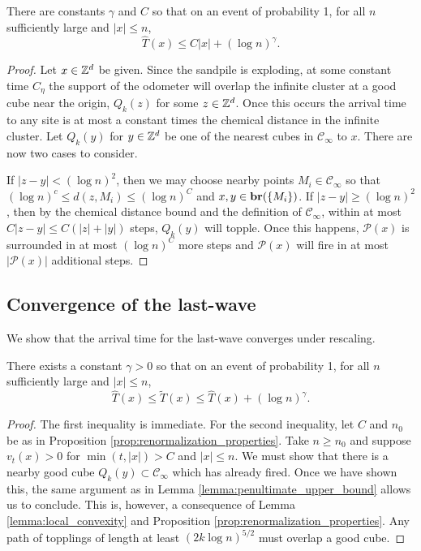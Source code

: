 \documentclass[12pt]{amsart}
\begin{document}
\begin{lemma} \label{lemma:penultimate_upper_bound}
	There are constants $\gamma$ and $C$ so that on an event of probability 1, for all $n$ sufficiently large and $|x| \leq n$, 
	\[
	\hat{T}(x) \leq  C |x| +  (\log n)^{\gamma} .
	\]
\end{lemma}
\begin{proof}
	Let $x \in \mathbb{Z}^d$ be given. Since the sandpile is exploding, at some constant time $C_\eta$
	the support of the odometer will overlap the infinite cluster at a good cube near the origin, $Q_k(z)$ for some $z \in \mathbb{Z}^d$. Once this occurs the arrival time to any site is at most a constant times the chemical distance in the infinite cluster. Let $Q_k(y)$ for $y \in \mathbb{Z}^d$ be one of the nearest cubes in $\mathcal{C}_{\infty}$ to $x$.  There are now two cases to consider.
	
	
	If $|z-y| < (\log n)^2$, then we may choose nearby points $M_{i} \in \mathcal{C}_{\infty}$ so that $(\log n)^{c} \leq d(z,M_i) \leq (\log n)^C$ and $x,y \in \mathbf{br}(\{M_i\})$. 
	If $|z-y| \geq (\log n)^2$, then by the chemical distance bound and the definition of $\mathcal{C}_{\infty}$, 
	within at most $C |z-y| \leq C(|z| + |y|)$ steps, $Q_k(y)$ will topple. 
	Once this happens, $\mathcal{P}(x)$ is surrounded in at most $(\log n)^C$ more steps and $\mathcal{P}(x)$ will fire in at most $|\mathcal{P}(x)|$ additional steps.
	
\end{proof}





\subsection{Convergence of the last-wave}
We show that the arrival time for the last-wave converges under rescaling. 

\begin{lemma} \label{lemma:last_penultimate_close}
	There exists a constant $\gamma > 0$ so that on an event of probability 1, for all $n$ sufficiently large and $|x| \leq n$,
	\[
	\hat{T}(x) \leq \tilde{T}(x) \leq \hat{T}(x) + (\log n)^{\gamma}.
	\]
\end{lemma}
\begin{proof}
	The first inequality is immediate.  For the second inequality, let $C$ and $n_0$ be as in Proposition \ref{prop:renormalization_properties}.
	Take $n \geq n_0$ and suppose $v_t(x) > 0$ for $\min(t, |x|) > C$ and $|x| \leq n$.  We must show that there is a nearby good cube $Q_k(y) \subset \mathcal{C}_{\infty}$
	which has already fired. Once we have shown this, the same argument as in Lemma \ref{lemma:penultimate_upper_bound}
	allows us to conclude. 	This is, however, a consequence of Lemma \ref{lemma:local_convexity} and Proposition \ref{prop:renormalization_properties}. Any path of topplings of length at least $( 2k \log n)^{5/2}$ must overlap a good cube. 
\end{proof}
\end{document}
